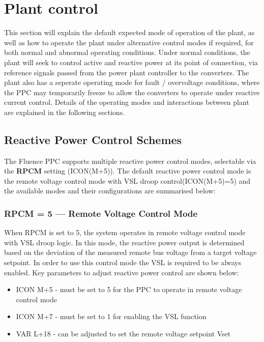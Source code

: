 \documentclass{../grid-link-report}
\begin{document}
	
	\section{Plant control}
	This section will explain the default expected mode of operation of the plant, as well as how to operate the plant under alternative control modes if required, for both normal and abnormal operating conditions. Under normal conditions, the plant will seek to control active and reactive power at its point of connection, via reference signals passed from the power plant controller to the converters. The plant also has a seperate operating mode for fault / overvoltage conditions, where the PPC may temporarily freeze to allow the converters to operate under reactive current control. Details of the operating modes and interactions between plant are explained in the following sections.
	
	\subsection{Reactive Power Control Schemes}
	The Fluence PPC supports multiple reactive power control modes, selectable via the \textbf{RPCM} setting (ICON(M+5)). The default reactive power control mode is the remote voltage control mode with VSL droop control(ICON(M+5)=5) and the available modes and their configurations are summarised below:


	

	
	
	\subsubsection{RPCM = 5 — Remote Voltage Control Mode}

	When RPCM is set to 5, the system operates in remote voltage control mode with \ac{VSL} droop logic. In this mode, the reactive power output is determined based on the deviation of the measured remote bus voltage from a target voltage setpoint. In order to use this control mode the VSL is required to be always enabled. Key parameters to adjust reactive power control are shown below:

	\begin{itemize}
		\item ICON M+5 - must be set to 5 for the PPC to operate in remote voltage control mode
		\item ICON M+7 - must be set to 1 for enabling the VSL function
		\item VAR L+18 - can be adjusted to set the remote voltage setpoint Vset

	\end{itemize}
	
\end{document}

